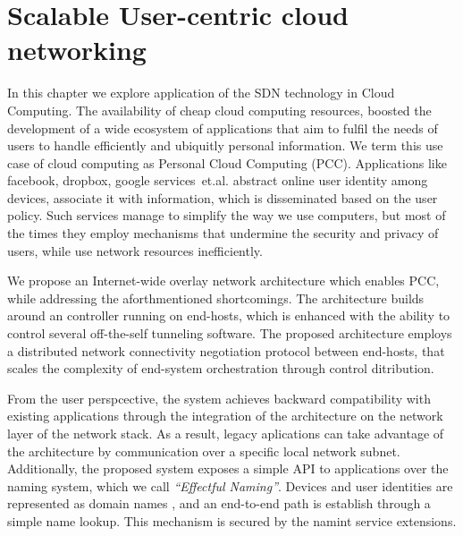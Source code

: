 \chapter{Scalable User-centric cloud networking}
\ifpdf
    \graphicspath{{Chapter3/Chapter3Figs/PNG/}{Chapter3/Chapter3Figs/PDF/}{Chapter3/Chapter3Figs/}}
\else
    \graphicspath{{Chapter3/Chapter3Figs/EPS/}{Chapter3/Chapter3Figs/}}
\fi

In this chapter we explore application of the SDN technology in Cloud Computing.
The availability of cheap cloud computing resources, boosted the development of
a wide ecosystem of applications that aim to fulfil the needs of users to handle
efficiently and ubiquitly personal information.  We term this use case of cloud
computing as Personal Cloud Computing (PCC). Applications like facebook,
dropbox, google services~et.al.  abstract online user identity among devices,
associate it with information, which is disseminated based on the user policy.
Such services manage to simplify the way we use computers, but most of the times
they employ mechanisms that undermine the security and privacy of users, while
use network resources inefficiently. 

We propose an Internet-wide overlay network architecture which enables PCC, while
addressing the aforthmentioned shortcomings. The architecture builds around an
\of controller running on end-hosts, which is enhanced with the ability to
control several off-the-self tunneling software. The proposed architecture employs
a distributed network connectivity negotiation protocol between end-hosts, that
scales the complexity of end-system orchestration through control ditribution.

From the user perspcective, the system achieves backward compatibility with
existing applications through the integration of the  architecture on the
network layer of the network stack. As a result, legacy aplications can take
advantage of the architecture by communication over a specific local
network subnet. Additionally, the proposed system exposes a simple API to
applications over the naming system, which we call {\it ``Effectful Naming''}.
Devices and user identities are represented as domain names , and an end-to-end 
path is establish through a simple name lookup. This mechanism is secured by the 
\dnssec namint service extensions. 

